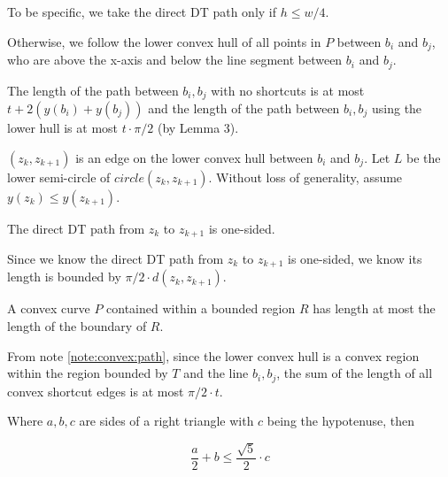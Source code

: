 \documentclass{tufte-handout}
\begin{document}
To be specific, we take the direct DT path only if $h \le w/4$.

Otherwise, we follow the lower convex hull of all points in $P$
between $b_i$ and $b_j$, who are above the x-axis and below the line
segment between $b_i$ and $b_j$.

The length of the path between $b_i,b_j$ with no shortcuts is at most
$t + 2(y(b_i) + y(b_j))$ and the length of the path between $b_i,b_j$
using the lower hull is at most $t \cdot \pi /2$ (by Lemma 3).


$(z_k,z_{k+1})$ is an edge on the lower convex hull between $b_i$ and
$b_j$.  Let $L$ be the lower semi-circle of $circle(z_k, z_{k+1})$.
Without loss of generality, assume $y(z_k) \le y(z_{k+1})$.

\begin{Lemma}

  \label{lemma:convex:path:one:sided}

  The direct DT path from $z_k$ to $z_{k+1}$ is one-sided.
  
\end{Lemma}

Since we know the direct DT path from $z_k$ to $z_{k+1}$ is one-sided,
we know its length is bounded by $\pi/2 \cdot d(z_k,z_{k+1})$.

\begin{Note}
  \label{note:convex:path}

  A convex curve $P$ contained within a bounded region $R$ has length
  at most the length of the boundary of $R$. \cite{Benson:1966}

\end{Note}

From note \ref{note:convex:path}, since the lower convex hull is a
convex region within the region bounded by $T$ and the line $b_i,b_j$,
the sum of the length of all convex shortcut edges is at most $\pi/2
\cdot t$.

\begin{Note}
  \label{note:right:triangle}

  Where $a,b,c$ are sides of a right triangle with $c$ being the
  hypotenuse, then

  \begin{displaymath}
    \frac{a}{2} + b \le \frac{\sqrt{5}}{2} \cdot c
  \end{displaymath}
  
\end{Note}
\end{document}
